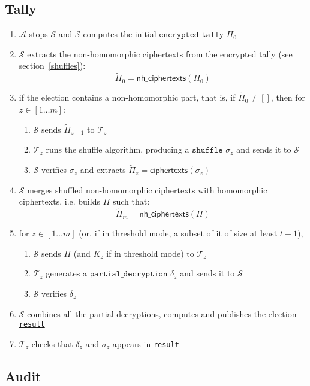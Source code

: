 \documentclass[a4paper]{article}
\newcommand{\etally}{\texttt{encrypted\_tally}}
\newcommand{\pdecryption}{\texttt{partial\_decryption}}
\newcommand{\result}{\texttt{result}}
\begin{document}
\subsection{Tally}

\begin{enumerate}
\item $\mathcal{A}$ stops $\mathcal{S}$ and  $\mathcal{S}$ computes the initial
  \hyperref[tally]{$\etally$} $\Pi_0$
\item $\mathcal{S}$ extracts the non-homomorphic ciphertexts from the
  encrypted tally (see
  section~\ref{shuffles}):
  \[\tilde\Pi_0=\textsf{nh\_ciphertexts}(\Pi_0)\]
\item if the election contains a non-homomorphic part, that is, if
  $\tilde\Pi_0\neq []$,
 then for $z\in[1\dots m]$:
  \begin{enumerate}
  \item $\mathcal{S}$ sends $\tilde\Pi_{z-1}$ to $\mathcal{T}_z$
  \item $\mathcal{T}_z$ runs the shuffle algorithm, producing a
    \hyperref[shuffles]{$\texttt{shuffle}$} $\sigma_z$ and sends it to
    $\mathcal{S}$
  \item $\mathcal{S}$ verifies $\sigma_z$ and extracts
    $\tilde\Pi_z=\textsf{ciphertexts}(\sigma_z)$
  \end{enumerate}
\item $\mathcal{S}$ merges shuffled non-homomorphic ciphertexts with
  homomorphic ciphertexts, i.e. builds $\Pi$ such
  that:\[\tilde\Pi_m=\textsf{nh\_ciphertexts}(\Pi)\]
\item for $z\in[1\dots m]$ (or, if in threshold mode, a subset of it
  of size at least $t+1$),
  \begin{enumerate}
  \item $\mathcal{S}$ sends $\Pi$ (and $K_z$ if in threshold mode) to
    $\mathcal{T}_z$
  \item $\mathcal{T}_z$ generates a \hyperref[tally]{$\pdecryption$} $\delta_z$
    and sends it to $\mathcal{S}$
  \item $\mathcal{S}$ verifies $\delta_z$
  \end{enumerate}
\item $\mathcal{S}$ combines all the partial decryptions, computes and publishes
  the election \hyperref[election-result]{\result}
\item $\mathcal{T}_z$ checks that $\delta_z$ and $\sigma_z$ appears in
  {\result}
\end{enumerate}

\subsection{Audit}
\end{document}

